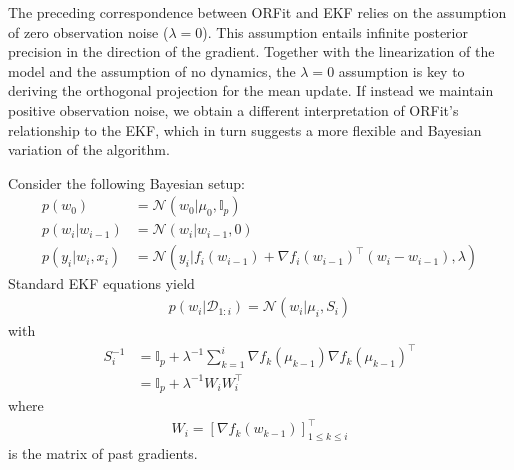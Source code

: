 The preceding correspondence between ORFit and EKF relies on the assumption of zero observation noise ($\lambda=0$). This assumption entails infinite posterior precision in the direction of the gradient. Together with the linearization of the model and the assumption of no dynamics, the $\lambda=0$ assumption is key to deriving the orthogonal projection for the mean update. If instead we maintain positive observation noise, we obtain a different interpretation of ORFit's relationship to the EKF, which in turn suggests a more flexible and Bayesian variation of the algorithm.

Consider the following Bayesian setup:
\begin{align}
    p\left(w_{0}\right)	&= \mathcal{N}\left(w_{0}\vert \mu_{0},\mathbb{I}_{p}\right) \\
    p\left(w_{i}\vert w_{i-1}\right) &= \mathcal{N}\left(w_{i}\vert w_{i-1},0\right) \\
    p\left(y_{i}\vert w_{i},x_{i}\right) &= \mathcal{N}\left(y_{i}\vert f_{i}\left(w_{i-1}\right)+\nabla f_{i}\left(w_{i-1}\right)^{\top}\left(w_{i}-w_{i-1}\right),\lambda\right)
\end{align} 
Standard EKF equations yield
\begin{align}
p\left(w_{i}\vert\mathcal{D}_{1:i}\right)=\mathcal{N}\left(w_{i}\vert\mu_{i},S_{i}\right)
\end{align} 
with 
\begin{align}
S_{i}^{-1}	&= \mathbb{I}_{p}+\lambda^{-1}\sum_{k=1}^{i}\nabla f_{k}\left(\mu_{k-1}\right)\nabla f_{k}\left(\mu_{k-1}\right)^{\top} \\
	&= \mathbb{I}_{p}+\lambda^{-1}W_{i}W_{i}^{\top}
\end{align} 
 where
\begin{align}
 W_{i}=\left[\nabla f_{k}\left(w_{k-1}\right)\right]_{1\le k\le i}^{\top}
\end{align} 
 is the matrix of past gradients.

